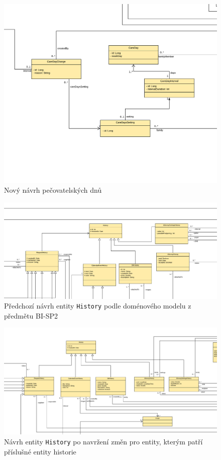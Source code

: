     \begin{figure}\centering
	       \includegraphics[angle=90, height=1.0\textheight]{pdfs/CareDays2}
	       \caption[Nový návrh pečovatelských dnů]{Nový návrh pečovatelských dnů}\label{image:caredays2}
        \end{figure}
    \begin{figure}\centering
        \includegraphics[angle=90, height=1.0\textheight]{pdfs/History1}
        \caption[Předchozí návrh entity \texttt{History}]{Předchozí návrh entity \texttt{History} podle doménového modelu z předmětu BI-SP2}\label{image:History1}
    \end{figure}
    \begin{figure}\centering
        \includegraphics[angle=90, height=1.0\textheight]{pdfs/History1_2}
        \caption[Návrh entity \texttt{History} po změnách návrhu]{Návrh entity \texttt{History} po navržení změn pro entity, kterým patří příslušné entity historie}\label{image:History1_2}
    \end{figure}

